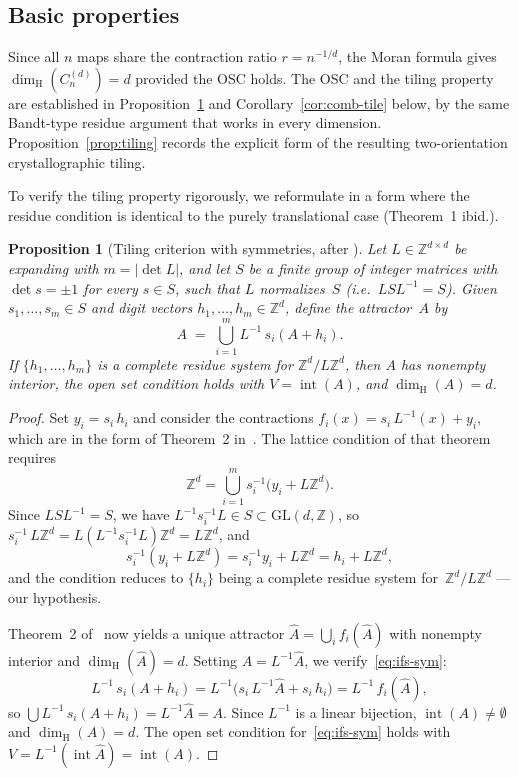 \documentclass{amsart}
\newtheorem{proposition}[theorem]{Proposition}
\theoremstyle{definition}
\theoremstyle{remark}
\newcommand{\Z}{\mathbb{Z}}
\newcommand{\dH}{\dim_{\mathrm{H}}}
\begin{document}
\subsection{Basic properties}

Since all $n$ maps share the contraction ratio $r = n^{-1/d}$, the
Moran formula gives $\dH(C_n^{(d)}) = d$ provided the OSC holds.
The OSC and the tiling property are established in
Proposition~\ref{prop:bandt-sym} and Corollary~\ref{cor:comb-tile}
below, by the same Bandt-type residue argument that works in every
dimension.  Proposition~\ref{prop:tiling} records the explicit form of
the resulting two-orientation crystallographic tiling.

To verify the tiling property rigorously, we reformulate
{\cite[Theorem~2]{bandt1991}} in a form where the residue condition
is identical to the purely translational case (Theorem~1 ibid.).

\begin{proposition}[Tiling criterion with symmetries,
  after {\cite[Theorem~2]{bandt1991}}]
\label{prop:bandt-sym}
Let $L \in \Z^{d \times d}$ be expanding with $m = |\det L|$,
and let $S$ be a finite group of integer matrices with
$\det s = \pm 1$ for every $s \in S$, such that $L$ normalizes~$S$
(i.e.\ $LSL^{-1} = S$).
Given $s_1,\ldots,s_m \in S$ and
\emph{digit vectors} $h_1,\ldots,h_m \in \Z^d$,
define the attractor~$A$ by
\begin{equation}\label{eq:ifs-sym}
  A \;=\; \bigcup_{i=1}^{m} L^{-1}\,s_i(A + h_i).
\end{equation}
If $\{h_1,\ldots,h_m\}$ is a complete residue system
for $\Z^d / L\Z^d$, then $A$ has nonempty interior,
the open set condition holds with
$V = \operatorname{int}(A)$, and $\dH(A) = d$.
\end{proposition}

\begin{proof}
Set $y_i = s_i\,h_i$ and consider the contractions
$f_i(x) = s_i\,L^{-1}(x) + y_i$, which are in the
form of Theorem~2 in~\cite{bandt1991}.
The lattice condition of that theorem requires
\[
  \Z^d = \bigcup_{i=1}^{m} s_i^{-1}\bigl(y_i + L\Z^d\bigr).
\]
Since $LSL^{-1} = S$, we have
$L^{-1}s_i^{-1}L \in S \subset \mathrm{GL}(d,\Z)$, so
$s_i^{-1}\,L\Z^d = L(L^{-1}s_i^{-1}L)\Z^d = L\Z^d$, and
\[
  s_i^{-1}(y_i + L\Z^d)
  = s_i^{-1}y_i + L\Z^d
  = h_i + L\Z^d,
\]
and the condition reduces to $\{h_i\}$ being a complete
residue system for~$\Z^d/L\Z^d$ --- our hypothesis.

Theorem~2 of~\cite{bandt1991} now yields a unique attractor
$\hat{A} = \bigcup_i f_i(\hat{A})$ with nonempty interior and
$\dH(\hat{A}) = d$.
Setting $A = L^{-1}\hat{A}$, we verify~\eqref{eq:ifs-sym}:
\[
  L^{-1}\,s_i(A + h_i)
  = L^{-1}\bigl(s_i\,L^{-1}\hat{A} + s_i\,h_i\bigr)
  = L^{-1}\,f_i(\hat{A}),
\]
so $\bigcup L^{-1}\,s_i(A + h_i)
  = L^{-1}\hat{A} = A$.
Since $L^{-1}$ is a linear bijection,
$\operatorname{int}(A) \ne \emptyset$ and $\dH(A) = d$.
The open set condition
for~\eqref{eq:ifs-sym} holds with
$V = L^{-1}(\operatorname{int}\hat{A}) = \operatorname{int}(A)$.
\end{proof}
\end{document}
